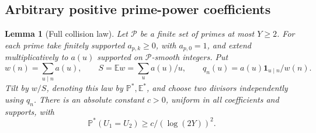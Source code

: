 \documentclass[11pt]{article}
\newtheorem{lemma}[theorem]{Lemma}
\theoremstyle{definition}
\newcommand{\E}{\mathbb E}
\newcommand{\Prob}{\mathbb P}
\newcommand{\ind}{\mathbf 1}
\theoremstyle{remark}
\numberwithin{equation}{section}
\begin{document}
\subsection{Arbitrary positive prime-power coefficients}
\begin{lemma}[Full collision law]\label{lem:d-full-collision}
Let $\mathcal P$ be a finite set of primes at most $Y\ge2$. For each prime take finitely supported
$a_{p,k}\ge0$, with $a_{p,0}=1$, and extend multiplicatively to $a(u)$ supported on
$\mathcal P$-smooth integers. Put
\begin{equation}\label{eq:d-general-data}
 w(n)=\sum_{u\mid n}a(u),\qquad S=\E w=\sum_u a(u)/u,\qquad
 q_n(u)=a(u)\ind_{u\mid n}/w(n).
\end{equation}
Tilt by $w/S$, denoting this law by $\Prob^*,\E^*$, and choose two divisors independently using
$q_n$. There is an absolute constant $c>0$, uniform in all coefficients and supports, with
\begin{equation}\label{eq:d-full-collision}
 \Prob^*(U_1=U_2)\ge c/(\log(2Y))^2.
\end{equation}
\end{lemma}
\end{document}
